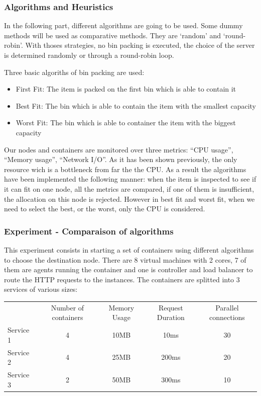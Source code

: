 \subsubsection{Algorithms and Heuristics}

In the following part, different algorithms are going to be used. Some dummy
methods will be used as comparative methods. They are `random' and
`round-robin'. With thoses strategies, no bin packing is executed, the choice
of the server is determined randomly or through a round-robin loop.

Three basic algoriths of bin packing are used:

\begin{itemize}
	\item{First Fit: The item is packed on the first bin which is able to contain it}
	\item{Best Fit: The bin which is able to contain the item with the smallest capacity}
	\item{Worst Fit: The bin which is able to container the item with the biggest capacity}
\end{itemize}

Our nodes and containers are monitored over three metrics: ``CPU usage'',
``Memory usage'', ``Network I/O''.  As it has been shown previously, the only
resource wich is a bottleneck from far the the CPU\@. As a result the
algorithms have been implemented the following manner: when the item is
inspected to see if it can fit on one node, all the metrics are compared, if
one of them is insufficient, the allocation on this node is rejected. However
in best fit and worst fit, when we need to select the best, or the worst, only
the CPU is considered.

\subsubsection{Experiment - Comparaison of algorithms}

This experiment consists in starting a set of containers using different
algorithms to choose the destination node. There are 8 virtual machines with 2
cores, 7 of them are agents running the container and one is controller and
load balancer to route the HTTP requests to the instances. The containers are
splitted into 3 services of various sizes:

\vspace{1em}
\begin{tabular}{l | c | c | c | c}
	& Number of containers & Memory Usage & Request Duration & Parallel connections \\
	Service 1 & 4 & 10MB & 10ms & 30 \\
	Service 2 & 4 & 25MB & 200ms & 20 \\
	Service 3 & 2 & 50MB & 300ms & 10 \\
\end{tabular}
\label{tab:exp2-services}
\vspace{1em}

